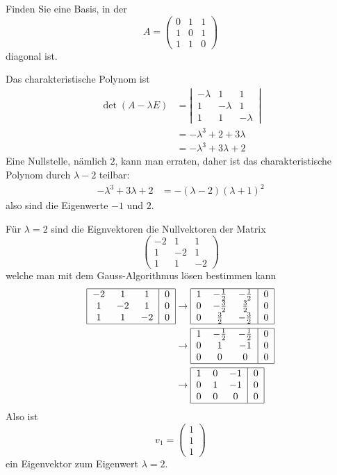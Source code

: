 Finden Sie eine Basis, in der
\[
A=\begin{pmatrix}
0&1&1\\
1&0&1\\
1&1&0
\end{pmatrix}
\]
diagonal ist.

\begin{loesung}
Das charakteristische Polynom ist
\begin{align*}
\det(A-\lambda E)
&=
\left|\,
\begin{matrix}
-\lambda&1&1\\
1&-\lambda&1\\
1&1&-\lambda
\end{matrix}
\,\right|
\\
&=-\lambda^3+2+3\lambda
\\
&=-\lambda^3+3\lambda+2
\end{align*}
Eine Nullstelle, nämlich $2$, kann man erraten, daher ist das
charakteristische Polynom durch $\lambda-2$ teilbar:
\begin{align*}
-\lambda^3+3\lambda+2
&=-(\lambda-2)(\lambda+1)^2
\end{align*}
also sind die Eigenwerte $-1$ und $2$.

Für $\lambda=2$ sind die Eignvektoren die Nullvektoren der Matrix
\[
\begin{pmatrix}
-2&1&1\\
1&-2&1\\
1&1&-2
\end{pmatrix}
\]
welche man mit dem Gauss-Algorithmus lösen bestimmen kann
\begin{align*}
\begin{tabular}{|ccc|c|}
\hline
$-2$&1&1&0\\
1&$-2$&1&0\\
1&1&$-2$&0\\
\hline
\end{tabular}
&\rightarrow
\begin{tabular}{|ccc|c|}
\hline
1&$-\frac12$&$-\frac12$&0\\
0&$-\frac32$&$\frac32$&0\\
0&$\frac32$&$-\frac32$&0\\
\hline
\end{tabular}
\\
&\rightarrow
\begin{tabular}{|ccc|c|}
\hline
1&$-\frac12$&$-\frac12$&0\\
0&1&$-1$&0\\
0&0&0&0\\
\hline
\end{tabular}
\\
&\rightarrow
\begin{tabular}{|ccc|c|}
\hline
1&0&$-1$&0\\
0&1&$-1$&0\\
0&0&0&0\\
\hline
\end{tabular}
\end{align*}
Also ist
\[
v_1=\begin{pmatrix}1\\1\\1\end{pmatrix}
\]
ein Eigenvektor zum Eigenwert $\lambda=2$.


\end{loesung}
